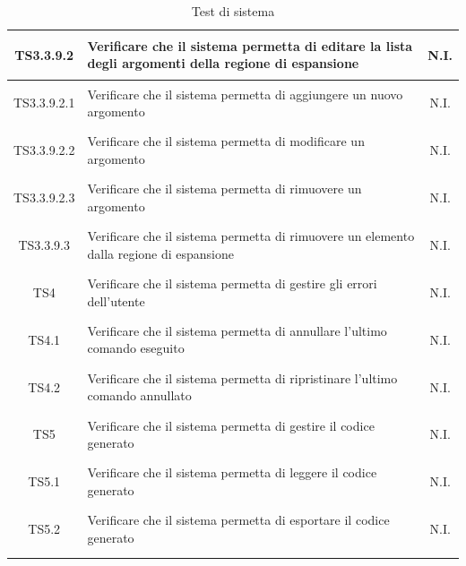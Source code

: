 \documentclass[../PianoDiQualifica.tex]{subfiles}
\begin{document}
\begin{longtable}{|c|>{\centering}p{10cm}|c|}
	\hline
	\hypertarget{TS3.3.9.2}{TS3.3.9.2} & Verificare che il sistema permetta di editare la lista degli argomenti della regione di espansione & N.I. \\
	\hline
	\hypertarget{TS3.3.9.2.1}{TS3.3.9.2.1} & Verificare che il sistema permetta di aggiungere un nuovo argomento & N.I. \\
	\hline
	\hypertarget{TS3.3.9.2.2}{TS3.3.9.2.2} & Verificare che il sistema permetta di modificare un argomento & N.I. \\
	\hline
	\hypertarget{TS3.3.9.2.3}{TS3.3.9.2.3} & Verificare che il sistema permetta di rimuovere un argomento & N.I. \\
	\hline
	\hypertarget{TS3.3.9.3}{TS3.3.9.3} & Verificare che il sistema permetta di rimuovere un elemento dalla regione di espansione & N.I. \\
	\hline
	\hypertarget{TS4}{TS4} & Verificare che il sistema permetta di gestire gli errori dell'utente & N.I. \\
	\hline
	\hypertarget{TS4.1}{TS4.1} & Verificare che il sistema permetta di annullare l'ultimo comando eseguito & N.I. \\
	\hline
	\hypertarget{TS4.2}{TS4.2} & Verificare che il sistema permetta di ripristinare l'ultimo comando annullato & N.I. \\
	\hline
	\hypertarget{TS5}{TS5} & Verificare che il sistema permetta di gestire il codice generato & N.I. \\
	\hline
	\hypertarget{TS5.1}{TS5.1} & Verificare che il sistema permetta di leggere il codice generato & N.I. \\
	\hline
	\hypertarget{TS5.2}{TS5.2} & Verificare che il sistema permetta di esportare il codice generato & N.I. \\
	\hline
\caption[Test di sistema]{Test di sistema}
\label{tabella:TestSistema}
\end{longtable}

\newpage
\end{document}
